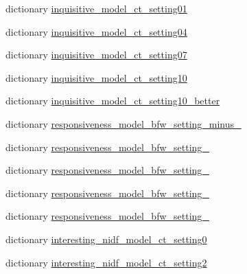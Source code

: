 \begin{DoxyCompactItemize}
\item 
dictionary \hyperlink{namespaceprojects_1_1controllable__dialogue_1_1mturk_1_1model__configs_a36d22c5f5d0833850ba4d75ba1d3d6db}{inquisitive\+\_\+model\+\_\+ct\+\_\+setting01}
\item 
dictionary \hyperlink{namespaceprojects_1_1controllable__dialogue_1_1mturk_1_1model__configs_a9b859fc853a4a5d8a1902d294908ab7b}{inquisitive\+\_\+model\+\_\+ct\+\_\+setting04}
\item 
dictionary \hyperlink{namespaceprojects_1_1controllable__dialogue_1_1mturk_1_1model__configs_a3029408c28edb3d240e036dc2850ba83}{inquisitive\+\_\+model\+\_\+ct\+\_\+setting07}
\item 
dictionary \hyperlink{namespaceprojects_1_1controllable__dialogue_1_1mturk_1_1model__configs_a23942df8cb68f9f32ea1c69640b250ee}{inquisitive\+\_\+model\+\_\+ct\+\_\+setting10}
\item 
dictionary \hyperlink{namespaceprojects_1_1controllable__dialogue_1_1mturk_1_1model__configs_a9a3a3acfdf346909049ed222ed7b7b7f}{inquisitive\+\_\+model\+\_\+ct\+\_\+setting10\+\_\+better}
\item 
dictionary \hyperlink{namespaceprojects_1_1controllable__dialogue_1_1mturk_1_1model__configs_a14ae43afc686c78c86d332e1db20f9d1}{responsiveness\+\_\+model\+\_\+bfw\+\_\+setting\+\_\+minus\+\_}
\item 
dictionary \hyperlink{namespaceprojects_1_1controllable__dialogue_1_1mturk_1_1model__configs_af567c6008c519bc451023994bed49e49}{responsiveness\+\_\+model\+\_\+bfw\+\_\+setting\+\_}
\item 
dictionary \hyperlink{namespaceprojects_1_1controllable__dialogue_1_1mturk_1_1model__configs_ab86cb9d4e17bddb2c181c6830c26267d}{responsiveness\+\_\+model\+\_\+bfw\+\_\+setting\+\_}
\item 
dictionary \hyperlink{namespaceprojects_1_1controllable__dialogue_1_1mturk_1_1model__configs_a1f84a2728aed499d3e28e193b58607f7}{responsiveness\+\_\+model\+\_\+bfw\+\_\+setting\+\_}
\item 
dictionary \hyperlink{namespaceprojects_1_1controllable__dialogue_1_1mturk_1_1model__configs_a4dfccf8354e7bef0c601454ee12e716e}{responsiveness\+\_\+model\+\_\+bfw\+\_\+setting\+\_}
\item 
dictionary \hyperlink{namespaceprojects_1_1controllable__dialogue_1_1mturk_1_1model__configs_ac1470612c61cb4ce5bacee472f85fcb0}{interesting\+\_\+nidf\+\_\+model\+\_\+ct\+\_\+setting0}
\item 
dictionary \hyperlink{namespaceprojects_1_1controllable__dialogue_1_1mturk_1_1model__configs_a4bbad1170b884741dce2b3a56e7157ad}{interesting\+\_\+nidf\+\_\+model\+\_\+ct\+\_\+setting2}

\end{DoxyCompactItemize}
